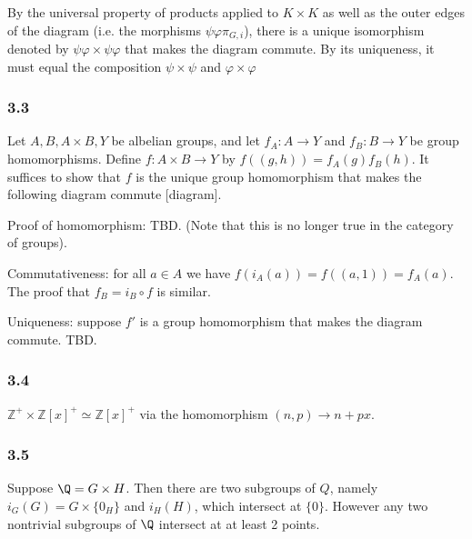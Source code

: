 \documentclass{article}
\def\Z{\mathbb{Z}}
\begin{document}
By the universal property of products applied to $K \times K$ as well as the outer edges of the diagram (i.e. the morphisms $\psi \varphi \pi_{G, i}$), there is a  unique isomorphism denoted by $\psi\varphi \times \psi\varphi$ that makes the diagram commute. By its uniqueness, it must equal the composition $\psi \times \psi$ and $\varphi \times \varphi$

\subsubsection*{3.3}

Let $A, B, A \times B, Y$ be albelian groups, and let $f_A : A \to Y$ and $f_B: B \to Y$ be group homomorphisms. Define $f: A \times B \to Y$ by $f((g, h)) = f_A(g) f_B(h)$. It suffices to show that $f$ is the unique group homomorphism that makes the following diagram commute [diagram].

Proof of homomorphism: TBD. (Note that this is no longer true in the category of groups).

Commutativeness: for all $a \in A$ we have $f(i_A(a)) = f((a, 1)) = f_A(a)$. The proof that $f_B = i_B \circ f$ is similar.

Uniqueness: suppose $f'$ is a group homomorphism that makes the diagram commute. TBD.

\subsubsection*{3.4}

$\Z^+ \times \Z[x]^+\simeq \Z[x]^+$ via the homomorphism $(n, p) \to n + px$.

\subsubsection*{3.5}

Suppose $\Q = G \times H$. Then there are two subgroups of $Q$, namely $i_G(G) = G \times \{0_H\}$ and $i_H(H)$, which intersect at $\{0\}$. However any two nontrivial subgroups of $\Q$ intersect at at least 2 points.
\end{document}
